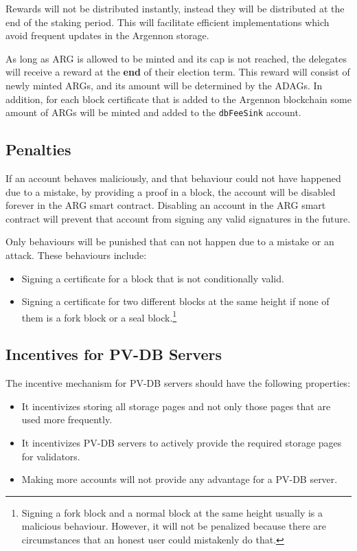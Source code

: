 Rewards will not be distributed instantly, instead they will be distributed at the end of the staking period.
This will facilitate efficient implementations which avoid frequent updates in the Argennon storage.

As long as ARG is allowed to be minted and its cap is not reached, the delegates will receive a reward at the
\textbf{end} of their election term. This reward will consist of newly minted ARGs, and its amount will be
determined by the ADAGs. In addition, for each block certificate that is added to the Argennon blockchain some amount
of ARGs will be minted and added to the \texttt{dbFeeSink} account.

\subsection{Penalties}\label{subsec:penalties}

If an account behaves maliciously, and that behaviour could not have happened due to a mistake, by providing a proof
in a block, the account will be disabled forever in the ARG smart contract. Disabling an account in the
ARG smart contract will prevent that account from signing any valid signatures in the future.

Only behaviours will be punished that can not happen due to a mistake or an attack. These behaviours include:
\begin{itemize}
    \item Signing a certificate for a block that is not conditionally valid.
    \item Signing a certificate for two different blocks at the same height if none of them
    is a fork block or a seal block.\footnote{Signing
    a fork block and a normal block at the same height usually is a malicious behaviour. However, it will not be
    penalized because there are circumstances that an honest user could mistakenly do that.}
\end{itemize}

\subsection{Incentives for PV-DB Servers}\label{subsec:PV-DB-servers}

The incentive mechanism for PV-DB servers should have the following properties:

\begin{itemize}
    \item It incentivizes storing all storage pages and not only those pages that are used more frequently.
    \item It incentivizes PV-DB servers to actively provide the required storage pages for validators.
    \item Making more accounts will not provide any advantage for a PV-DB server.
\end{itemize}

